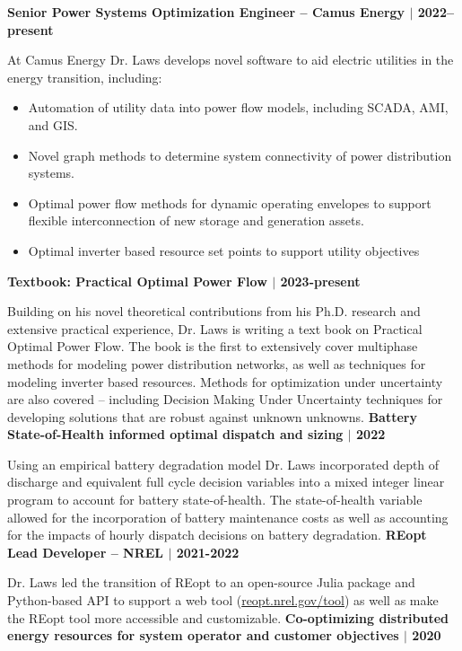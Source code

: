 \documentclass[a4paper,12pt]{report}
\begin{document}
\noindent
\textbf{Senior Power Systems Optimization Engineer -- Camus Energy $|$ 2022--present}

At Camus Energy Dr. Laws develops novel software to aid electric utilities in the energy transition,
including:
\begin{itemize}
    \item Automation of utility data into power flow models, including SCADA, AMI, and GIS.
    \item Novel graph methods to determine system connectivity of power distribution systems.
    \item Optimal power flow methods for dynamic operating envelopes to support flexible
    interconnection of new storage and generation assets.
    \item Optimal inverter based resource set points to support utility objectives
\end{itemize}

\noindent
\textbf{Textbook: Practical Optimal Power Flow $|$ 2023-present}

Building on his novel theoretical contributions from his Ph.D. research and extensive practical
experience, Dr. Laws is writing a text book on Practical Optimal Power Flow. The book is the first
to extensively cover multiphase methods for modeling power distribution networks, as well as
techniques for modeling inverter based resources. Methods for optimization under uncertainty are also
covered -- including Decision Making Under Uncertainty techniques for developing solutions that are
robust against unknown unknowns.
\newline
\newline
\noindent
\textbf{Battery State-of-Health informed optimal dispatch and sizing $|$ 2022}

Using an empirical battery degradation model Dr. Laws incorporated depth of discharge and equivalent
full cycle decision variables into a mixed integer linear program to account for battery
state-of-health. The state-of-health variable allowed for the incorporation of battery maintenance
costs as well as accounting for the impacts of hourly dispatch decisions on battery degradation.
\newline
\newline
\noindent
\textbf{REopt Lead Developer -- NREL $|$ 2021-2022}

Dr. Laws led the transition of REopt to an open-source Julia package and Python-based API to support
a web tool (\href{http://reopt.nrel.gov/tool}{reopt.nrel.gov/tool}) as well as make the REopt tool
more accessible and customizable.
\newline
\newline
\noindent
\textbf{Co-optimizing distributed energy resources for system operator and customer objectives $|$ 2020}
\end{document}
